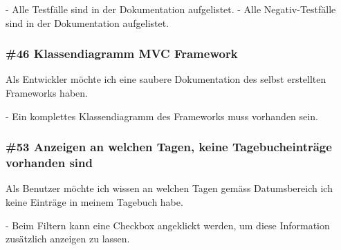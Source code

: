  \noindent
 - Alle Testfälle sind in der Dokumentation aufgelistet.
 - Alle Negativ-Testfälle sind in der Dokumentation aufgelistet.

 \subsubsection*{\#46 Klassendiagramm MVC Framework}
 Als Entwickler möchte ich eine saubere Dokumentation des selbst erstellten Frameworks haben.

 \noindent
 - Ein komplettes Klassendiagramm des Frameworks muss vorhanden sein.

 \subsubsection*{\#53 Anzeigen an welchen Tagen, keine Tagebucheinträge vorhanden sind}
 Als Benutzer möchte ich wissen an welchen Tagen gemäss Datumsbereich ich keine Einträge in meinem Tagebuch habe.

 \noindent
 - Beim Filtern kann eine Checkbox angeklickt werden, um diese Information zusätzlich anzeigen zu lassen.

 